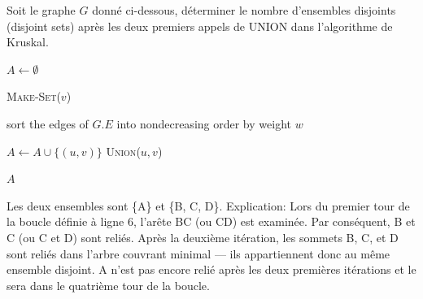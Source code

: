 \begin{Exercice}[10 minutes]
Soit le graphe $G$ donné ci-dessous, déterminer le nombre d'ensembles disjoints (disjoint sets) après les deux premiers appels de \textsc{UNION} dans l'algorithme de Kruskal.
\begin{center}
\end{center}
    \begin{algorithm}[H]
\caption{MST-KRUSKAL($G, w$)}
\begin{algorithmic}[1]

\State $A \gets \emptyset$

    \State \textsc{Make-Set}($v$)
\EndFor

\State sort the edges of $G.E$ into nondecreasing order by weight $w$

        \State $A \gets A \cup \{(u, v)\}$
        \State \textsc{Union}($u, v$)
    \EndIf
\EndFor

\State \Return $A$

\end{algorithmic}
\end{algorithm}

\begin{solution}
Les deux ensembles sont \{A\} et \{B, C, D\}. Explication: Lors du premier tour de la boucle définie à ligne 6, l'arête BC (ou CD) est examinée. Par conséquent, B et C (ou C et D) sont reliés. Après la deuxième itération, les sommets B, C, et D sont reliés dans l'arbre couvrant minimal — ils appartiennent donc au même ensemble disjoint. A n'est pas encore relié après les deux premières itérations et le sera dans le quatrième tour de la boucle. 
\end{solution}
\end{Exercice}



